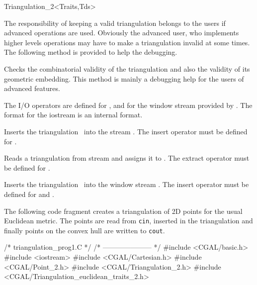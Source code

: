 \begin{ccClassTemplate}{Triangulation_2<Traits,Tds>}
\begin{ccAdvanced}
The responsibility of keeping a valid triangulation
belongs to the users if advanced operations are used.
Obviously the advanced user, who implements higher levels operations
may have to make a triangulation invalid at some times. The following
method is provided to help the debugging.

{Checks the combinatorial validity of the triangulation and
also the validity of its geometric embedding.
 This method is  mainly a debugging help
for the users of advanced features.
}
\end{ccAdvanced}





The I/O operators are defined for , and for
the window stream provided by \cgal. The format for the iostream
is an internal format. 


{Inserts the triangulation \ccVar\ into the stream .
\ccPrecond The insert operator must be defined for .}

{Reads a triangulation from stream  and assigns it
to \ccVar. \ccPrecond The extract operator must be defined for .}


{Inserts the triangulation \ccVar\ into the window stream .
The insert operator must be defined for 
and .}

\ccExample

The following code fragment creates a  triangulation of 2D points
for the  usual Euclidean metric. The points are read from {\tt cin},
inserted in the triangulation 
and finally points on the convex hull are written to {\tt cout}. 


\begin{cprog}
/* triangulation_prog1.C */
/* --------------------- */
#include <CGAL/basic.h>
#include <iostream>
#include <CGAL/Cartesian.h>
#include <CGAL/Point_2.h>
#include <CGAL/Triangulation_2.h>
#include <CGAL/Triangulation_euclidean_traits_2.h>


\end{cprog}
\end{ccClassTemplate}
